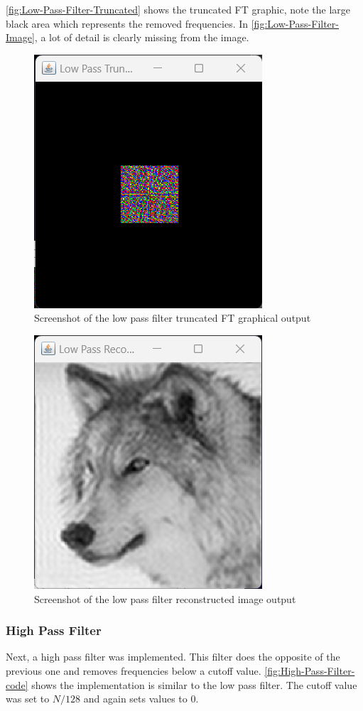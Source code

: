     \autoref{fig:Low-Pass-Filter-Truncated} shows the truncated FT graphic, note the large black area which represents the removed frequencies. In \autoref{fig:Low-Pass-Filter-Image}, a lot of detail is clearly missing from the image.
    \begin{figure}[H]
        \centering
        \includegraphics[width=0.49\columnwidth]{Figures/Week 1/W1-Low-Pass-Truncated.png}
        \caption{Screenshot of the low pass filter truncated FT graphical output}
        \label{fig:Low-Pass-Filter-Truncated}
      \end{figure}
    \begin{figure}[H]
        \centering
        \includegraphics[width=0.49\columnwidth]{Figures/Week 1/W1-Low-Pass-Reconstructed.png}
        \caption{Screenshot of the low pass filter reconstructed image output}
        \label{fig:Low-Pass-Filter-Image}
      \end{figure}

    
    \newpage    
    \subsubsection{High Pass Filter}
    Next, a high pass filter was implemented. This filter does the opposite of the previous one and removes frequencies below a cutoff value. \autoref{fig:High-Pass-Filter-code} shows the implementation is similar to the low pass filter. The cutoff value was set to $N/128$ and again sets values to $0$. 
    
